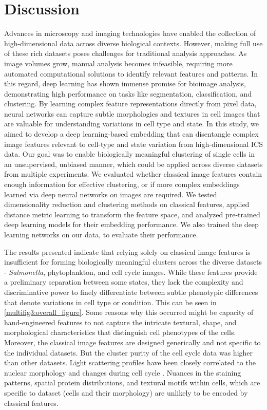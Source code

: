 \documentclass[12pt,a4paper]{article}
\begin{document}
\newpage
\section{Discussion}
\label{Discussion}


Advances in microscopy and imaging technologies have enabled the collection of high-dimensional data across diverse biological contexts. However, making full use of these rich datasets poses challenges for traditional analysis approaches. As image volumes grow, manual analysis becomes infeasible, requiring more automated computational solutions to identify relevant features and patterns. In this regard, deep learning has shown immense promise for bioimage analysis, demonstrating high performance on tasks like segmentation, classification, and clustering. By learning complex feature representations directly from pixel data, neural networks can capture subtle morphologies and textures in cell images that are valuable for understanding variations in cell type and state. In this study, we aimed to develop a deep learning-based embedding that can disentangle complex image features relevant to cell-type and state variation from high-dimensional ICS data. Our goal was to enable biologically meaningful clustering of single cells in an unsupervised, unbiased manner, which could be applied across diverse datasets from multiple experiments. We evaluated whether classical image features contain enough information for effective clustering, or if more complex embeddings learned via deep neural networks on images are required. We tested dimensionality reduction and clustering methods on classical features, applied distance metric learning to transform the feature space, and analyzed pre-trained deep learning models for their embedding performance. We also trained the deep learning networks on our data, to evaluate their performance.

The results presented indicate that relying solely on classical image features is insufficient for forming biologically meaningful clusters across the diverse datasets - \textit{Salmonella}, phytoplankton, and cell cycle images. While these features provide a preliminary separation between some states, they lack the complexity and discriminative power to finely differentiate between subtle phenotypic differences that denote variations in cell type or condition. This can be seen in \ref{multifig3:overall_figure}. Some reasons why this occurred might be capacity of hand-engineered features to not capture the intricate textural, shape, and morphological characteristics that distinguish cell phenotypes of the cells. Moreover, the classical image features are designed generically and not specific to the individual datasets. But the cluster purity of the cell cycle data was higher than other datasets. Light scattering profiles have been closely correlated to the nuclear morphology and changes during cell cycle \cite{WOS:A1974T155500001, benson_mcdougal_coffey_1984}. Nuances in the staining patterns, spatial protein distributions, and textural motifs within cells, which are specific to dataset (cells and their morphology) are unlikely to be encoded by classical features.
\end{document}
